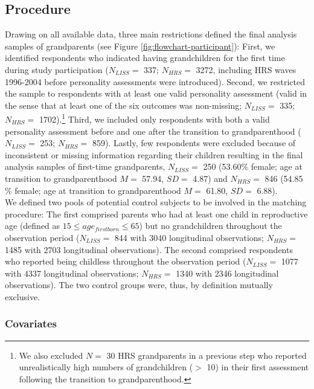\documentclass[
  english,
  man, noextraspace]{apa7}
\begin{document}
\hypertarget{procedure}{%
\subsection{Procedure}\label{procedure}}

Drawing on all available data, three main restrictions defined the final analysis samples of grandparents (see Figure \ref{fig:flowchart-participant}): First, we identified respondents who indicated having grandchildren for the first time during study participation (\(N_{LISS} =\) 337; \(N_{HRS} =\) 3272, including HRS waves 1996-2004 before personality assessments were introduced). Second, we restricted the sample to respondents with at least one valid personality assessment (valid in the sense that at least one of the six outcomes was non-missing; \(N_{LISS} =\) 335; \(N_{HRS} =\) 1702).\footnote{We also excluded \(N =\) 30 HRS grandparents in a previous step who reported unrealistically high numbers of grandchildren (\(>\) 10) in their first assessment following the transition to grandparenthood.} Third, we included only respondents with both a valid personality assessment before and one after the transition to grandparenthood (\(N_{LISS} =\) 253; \(N_{HRS} =\) 859). Lastly, few respondents were excluded because of inconsistent or missing information regarding their children resulting in the final analysis samples of first-time grandparents, \(N_{LISS} =\) 250 (53.60\(\%\) female; age at transition to grandparenthood \(M =\) 57.94, \(SD =\) 4.87) and \(N_{HRS} =\) 846 (54.85\(\%\) female; age at transition to grandparenthood \(M =\) 61.80, \(SD =\) 6.88).\\
We defined two pools of potential control subjects to be involved in the matching procedure: The first comprised parents who had at least one child in reproductive age (defined as \(15 \leq age_{firstborn}\leq65\)) but no grandchildren throughout the observation period (\(N_{LISS} =\) 844 with 3040 longitudinal observations; \(N_{HRS} =\) 1485 with 2703 longitudinal observations). The second comprised respondents who reported being childless throughout the observation period (\(N_{LISS} =\) 1077 with 4337 longitudinal observations; \(N_{HRS} =\) 1340 with 2346 longitudinal observations). The two control groups were, thus, by definition mutually exclusive.

\hypertarget{covariates}{%
\subsubsection{Covariates}\label{covariates}}
\end{document}
